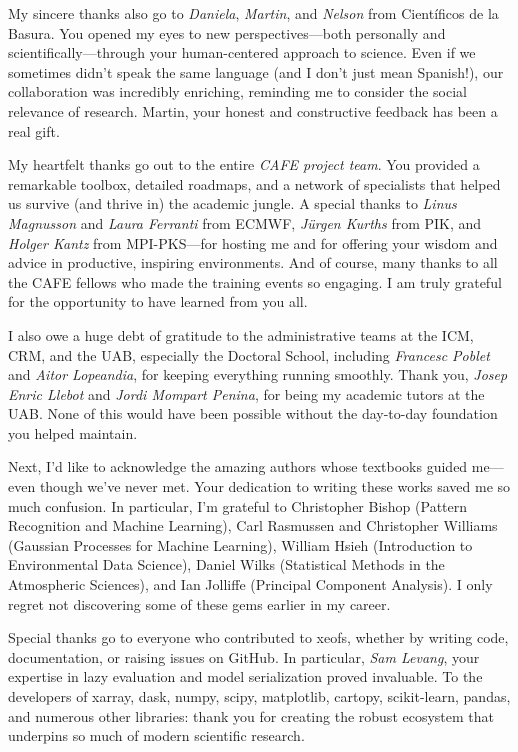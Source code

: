 \begin{acknowledgements}
My sincere thanks also go to \emph{Daniela}, \emph{Martin}, and \emph{Nelson} from Científicos de la Basura. You opened my eyes to new perspectives---both personally and scientifically---through your human-centered approach to science. Even if we sometimes didn't speak the same language (and I don't just mean Spanish!), our collaboration was incredibly enriching, reminding me to consider the social relevance of research. Martin, your honest and constructive feedback has been a real gift.


My heartfelt thanks go out to the entire \emph{CAFE project team}. You provided a remarkable toolbox, detailed roadmaps, and a network of specialists that helped us survive (and thrive in) the academic jungle. A special thanks to \emph{Linus Magnusson} and \emph{Laura Ferranti} from ECMWF, \emph{Jürgen Kurths} from PIK, and \emph{Holger Kantz} from MPI-PKS---for hosting me and for offering your wisdom and advice in productive, inspiring environments. And of course, many thanks to all the CAFE fellows who made the training events so engaging. I am truly grateful for the opportunity to have learned from you all.

I also owe a huge debt of gratitude to the administrative teams at the ICM, CRM, and the UAB, especially the Doctoral School, including \emph{Francesc Poblet} and \emph{Aitor Lopeandia}, for keeping everything running smoothly. Thank you, \emph{Josep Enric Llebot} and \emph{Jordi Mompart Penina}, for being my academic tutors at the UAB. None of this would have been possible without the day-to-day foundation you helped maintain.

Next, I'd like to acknowledge the amazing authors whose textbooks guided me---even though we've never met. Your dedication to writing these works saved me so much confusion. In particular, I'm grateful to Christopher Bishop (Pattern Recognition and Machine Learning), Carl Rasmussen and Christopher Williams (Gaussian Processes for Machine Learning), William Hsieh (Introduction to Environmental Data Science), Daniel Wilks (Statistical Methods in the Atmospheric Sciences), and Ian Jolliffe (Principal Component Analysis). I only regret not discovering some of these gems earlier in my career.

Special thanks go to everyone who contributed to xeofs, whether by writing code, documentation, or raising issues on GitHub. In particular, \emph{Sam Levang}, your expertise in lazy evaluation and model serialization proved invaluable. To the developers of xarray, dask, numpy, scipy, matplotlib, cartopy, scikit-learn, pandas, and numerous other libraries: thank you for creating the robust ecosystem that underpins so much of modern scientific research.


\end{acknowledgements}
